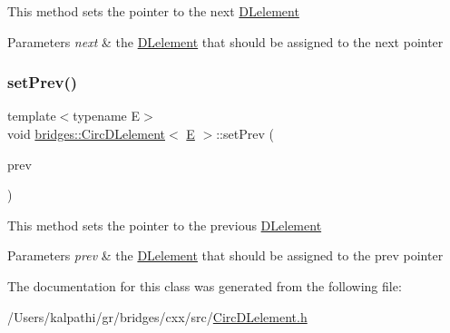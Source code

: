 This method sets the pointer to the next \mbox{\hyperlink{classbridges_1_1_d_lelement}{D\+Lelement}}


\begin{DoxyParams}{Parameters}
{\em next} & the \mbox{\hyperlink{classbridges_1_1_d_lelement}{D\+Lelement}} that should be assigned to the next pointer \\
\hline
\end{DoxyParams}
\mbox{\label{classbridges_1_1_circ_d_lelement_a5b2a0dad47208829bb2c17d8bc0ee74d}} 
\subsubsection{\texorpdfstring{setPrev()}{setPrev()}}
{\footnotesize\ttfamily template$<$typename E$>$ \\
void \mbox{\hyperlink{classbridges_1_1_circ_d_lelement}{bridges\+::\+Circ\+D\+Lelement}}$<$ \mbox{\hyperlink{namespacebridges_acfb0a4f7877d8f63de3e6862004c50eda3a3ea00cfc35332cedf6e5e9a32e94da}{E}} $>$\+::set\+Prev (\begin{DoxyParamCaption}\item[{\mbox{\hyperlink{classbridges_1_1_circ_d_lelement}{Circ\+D\+Lelement}}$<$ \mbox{\hyperlink{namespacebridges_acfb0a4f7877d8f63de3e6862004c50eda3a3ea00cfc35332cedf6e5e9a32e94da}{E}} $>$ $\ast$}]{prev }\end{DoxyParamCaption})\hspace{0.3cm}{\ttfamily [inline]}}

This method sets the pointer to the previous \mbox{\hyperlink{classbridges_1_1_d_lelement}{D\+Lelement}} 
\begin{DoxyParams}{Parameters}
{\em prev} & the \mbox{\hyperlink{classbridges_1_1_d_lelement}{D\+Lelement}} that should be assigned to the prev pointer \\
\hline
\end{DoxyParams}


The documentation for this class was generated from the following file\+:\begin{DoxyCompactItemize}
\item 
/\+Users/kalpathi/gr/bridges/cxx/src/\mbox{\hyperlink{_circ_d_lelement_8h}{Circ\+D\+Lelement.\+h}}\end{DoxyCompactItemize}
